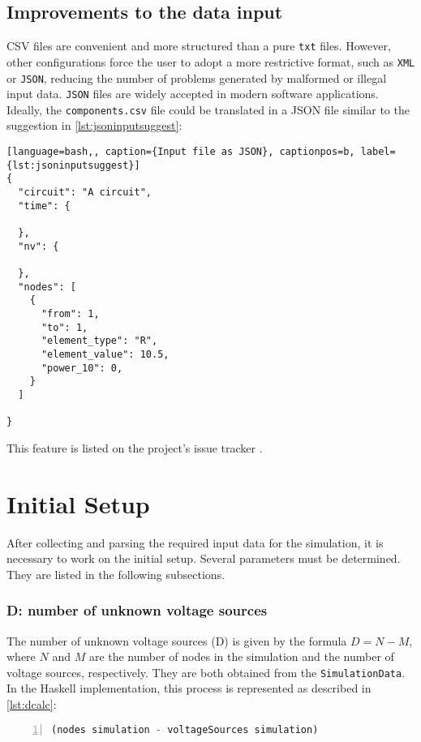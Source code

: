 \subsection{ Improvements to the data input }

CSV files are convenient and more structured than a pure \lstinline!txt! files. However, other configurations force the user to adopt a more restrictive format, such as \lstinline!XML! or \lstinline!JSON!, reducing the number of problems generated by malformed or illegal input data. \lstinline!JSON! files are widely accepted in modern software applications. Ideally, the \lstinline!components.csv! file could be translated in a JSON file similar to the suggestion in \cref{lst:jsoninputsuggest}:

\begin{lstlisting}[language=bash,, caption={Input file as JSON}, captionpos=b, label={lst:jsoninputsuggest}]
{
  "circuit": "A circuit",
  "time": {
    
  },
  "nv": {
    
  },
  "nodes": [
    {
      "from": 1,
      "to": 1,
      "element_type": "R",
      "element_value": 10.5,
      "power_10": 0,
    }
  ]
  
}
\end{lstlisting}

This feature is listed on the project's issue tracker \cite{thtahs}.

\section{ Initial Setup }

After collecting and parsing the required input data for the simulation, it is necessary to work on the initial setup. Several parameters must be determined. They are listed in the following subsections.

\subsubsection {D: number of unknown voltage sources}

The number of unknown voltage sources (D) is given by the formula $ D = N - M $, where $ N $ and $ M $ are the number of nodes in the simulation and the number of voltage sources, respectively. They are both obtained from the \lstinline!SimulationData!. In the Haskell implementation, this process is represented as described in \cref{lst:dcalc}:

\begin{lstlisting}[language=Haskell, numbers=left, caption={Determining the number of unknown voltage sources D}, captionpos=b, label={lst:dcalc}]
(nodes simulation - voltageSources simulation)
\end{lstlisting}

